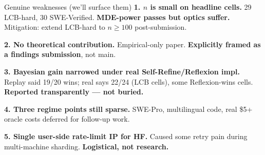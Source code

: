 \documentclass[10pt]{beamer}
\newcommand{\good}[1]{\textcolor{accentGreen}{\textbf{#1}}}
\newcommand{\warn}[1]{\textcolor{accentOrange}{\textbf{#1}}}
\begin{document}
\begin{frame}{Genuine weaknesses (we'll surface them)}
\vspace{0.1cm}
\textcolor{accentRed}{\textbf{1. $n$ is small on headline cells.}} 29 LCB-hard,
30 SWE-Verified. \warn{MDE-power passes but optics suffer.} Mitigation:
extend LCB-hard to $n \geq 100$ post-submission.

\vspace{0.15cm}
\textcolor{accentRed}{\textbf{2. No theoretical contribution.}} Empirical-only
paper. \warn{Explicitly framed as a findings submission}, not main.

\vspace{0.15cm}
\textcolor{accentRed}{\textbf{3. Bayesian gain narrowed under real
Self-Refine/Reflexion impl.}} Replay said 19/20 wins; real says 22/24
(LCB cells), some Reflexion-wins cells. \good{Reported transparently --- not
buried.}

\vspace{0.15cm}
\textcolor{accentRed}{\textbf{4. Three regime points still sparse.}} SWE-Pro,
multilingual code, real \$5+ oracle costs deferred for follow-up work.

\vspace{0.15cm}
\textcolor{accentRed}{\textbf{5. Single user-side rate-limit IP for HF.}}
Caused some retry pain during multi-machine sharding. \warn{Logistical, not
research.}
\end{frame}
\end{document}
